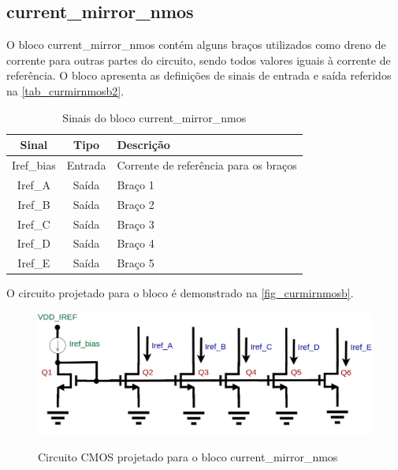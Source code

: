 \renewcommand{\NomeBloco}{current\_mirror\_nmos}
\renewcommand{\NomeBlocoNoUnderline}{curmirnmosb}
\renewcommand{\NomePTab}{tab_\NomeBlocoNoUnderline}
\renewcommand{\NomeSTab}{tab_\NomeBlocoNoUnderline2}
\renewcommand{\NomePFig}{fig_\NomeBlocoNoUnderline}
\renewcommand{\NomeSFig}{fig_\NomeBlocoNoUnderline2}
\renewcommand{\NomeTTab}{tab_\NomeBlocoNoUnderline3}
\renewcommand{\NomeQTab}{tab_\NomeBlocoNoUnderline4}

\subsection{current\_mirror\_nmos}

O bloco \NomeBloco{} cont\'em alguns braços utilizados como dreno de corrente para outras partes do circuito, sendo todos valores iguais \`a corrente de refer\^encia. O bloco apresenta as definições de sinais de entrada e sa\'ida referidos na \autoref{\NomeSTab}.

\begin{table}[!h]
\caption{Sinais do bloco \NomeBloco}
\label{\NomeSTab}
\centering
\begin{tabular}{ccl}

    \toprule
    Sinal & Tipo    & Descrição        \\
    \midrule \midrule
    Iref\_bias   & Entrada   &  Corrente de refer\^encia para os braços \\
    \midrule
    Iref\_A   & Saída   &  Braço 1 \\
    \midrule
    Iref\_B   & Saída   &  Braço 2 \\
    \midrule
    Iref\_C   & Saída   &  Braço 3 \\
    \midrule
    Iref\_D   & Saída   &  Braço 4 \\
    \midrule
    Iref\_E   & Saída   &  Braço 5 \\
    \bottomrule
\end{tabular}
\end{table}

O circuito projetado para o bloco \'e demonstrado na \autoref{\NomePFig}.

\begin{figure}[htb]
 \centering
    \centering
    \caption{Circuito CMOS projetado para o bloco \NomeBloco} 
    \includegraphics[scale=0.3]{Circuitos/current_mirror.png}
    \label{\NomePFig}
\end{figure}

